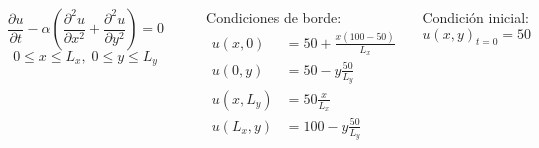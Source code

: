 \documentclass[9pt, aspectratio=169]{beamer}
\begin{document}
\begin{frame}
\begin{columns}
   \[ \frac{\partial u}{\partial t} - \alpha \left( \frac{\partial^2 u}{\partial x^2} + \frac{\partial^2 u}{\partial y^2} \right) = 0 \]
   \[0 \leq x \leq L_x, \; 0 \leq y \leq L_y\]

 \begin{center}
 \includegraphics[width=1.0\textwidth]{code/temp-inicial.pdf}
\end{center}

Condiciones de borde:
   \begin{align*}
       u(x, 0) &= 50 + \frac{x (100 - 50)}{L_x}  \\
       u(0, y) &= 50 - y \frac{50}{L_y} \\
    u(x, L_y) &= 50  \frac{x}{L_x} \\
    u(L_x, y) &= 100 - y \frac{50}{L_y} \\
   \end{align*}

Condición inicial:
\[ u(x, y)_{t=0} = 50 \]
\end{columns}
\end{frame}
\end{document}
